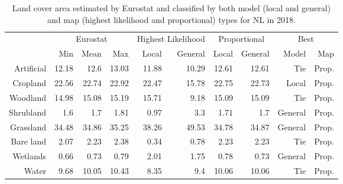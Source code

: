     \begin{table}[H]
    \centering
    \caption{Land cover area estimated by Eurostat and classified by both model (local and general) and map (highest likelihood and proportional) types for NL in 2018.}
    
    \begin{tabular}{r|rrr|rr|rr|rr}
    \toprule
    {} & \multicolumn{3}{|c}{Eurostat} & \multicolumn{2}{|c}{Highest Likelihood} & \multicolumn{2}{|c}{Proportional} & \multicolumn{2}{|c}{Best} \\
    {} &      Min &   Mean &    Max &              Local & General &        Local & General &    Model &    Map \\
    \midrule
    Artificial &    12.18 &   12.6 &  13.03 &              11.88 &   10.29 &        12.61 &   12.61 &      Tie &  Prop. \\
    Cropland   &    22.56 &  22.74 &  22.92 &              22.47 &   15.78 &        22.75 &   22.73 &    Local &  Prop. \\
    Woodland   &    14.98 &  15.08 &  15.19 &              15.71 &    9.18 &        15.09 &   15.09 &      Tie &  Prop. \\
    Shrubland  &      1.6 &    1.7 &   1.81 &               0.97 &     3.3 &         1.71 &     1.7 &  General &  Prop. \\
    Grassland  &    34.48 &  34.86 &  35.25 &              38.26 &   49.53 &        34.78 &   34.87 &  General &  Prop. \\
    Bare land  &     2.07 &   2.23 &   2.38 &               0.34 &    0.78 &         2.23 &    2.23 &      Tie &  Prop. \\
    Wetlands   &     0.66 &   0.73 &   0.79 &               2.01 &    1.75 &         0.78 &    0.73 &  General &  Prop. \\
    Water      &     9.68 &  10.05 &  10.43 &               8.35 &     9.4 &        10.06 &   10.06 &      Tie &  Prop. \\
    \bottomrule
    \end{tabular}
    \end{table}